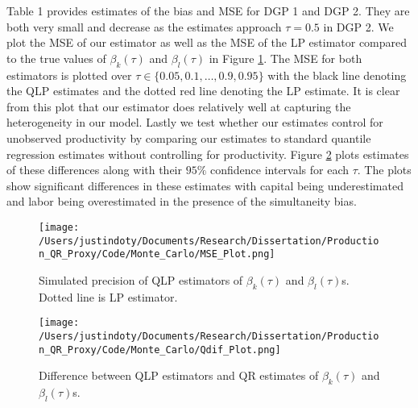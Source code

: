 \documentclass[11pt]{article}
\begin{document}
Table 1 provides estimates of the bias and MSE for DGP 1 and DGP 2. They are both very small and decrease as the estimates approach $\tau=0.5$ in DGP 2. We plot the MSE of our estimator as well as the MSE of the LP estimator compared to the true values of $\beta_{k}(\tau)$ and $\beta_{l}(\tau)$ in Figure \ref{fig:MSE}. The MSE for both estimators is plotted over $\tau\in\{0.05, 0.1, \dots, 0.9, 0.95\}$  with the black line denoting the QLP estimates and the dotted red line denoting the LP estimate. It is clear from this plot that our estimator does relatively well at capturing the heterogeneity in our model. Lastly we test whether our estimates control for unobserved productivity by comparing our estimates to standard quantile regression estimates without controlling for productivity. Figure \ref{fig:QDIF} plots estimates of these differences along with their $95\%$ confidence intervals for each $\tau$. The plots show significant differences in these estimates with capital being underestimated and labor being overestimated in the presence of the simultaneity bias.



\begin{figure}[H]
\centering
\caption{Simulated precision of  QLP estimators of $\beta_{k}(\tau)$ and $\beta_{l}(\tau)$s. Dotted line is LP estimator.}
\texttt{[image: /Users/justindoty/Documents/Research/Dissertation/Production\_QR\_Proxy/Code/Monte\_Carlo/MSE\_Plot.png]}
\label{fig:MSE}
\end{figure}

\begin{figure}[ht]
\centering
\caption{Difference between QLP estimators and QR estimates of $\beta_{k}(\tau)$ and $\beta_{l}(\tau)$s.}
\texttt{[image: /Users/justindoty/Documents/Research/Dissertation/Production\_QR\_Proxy/Code/Monte\_Carlo/Qdif\_Plot.png]}
\label{fig:QDIF}
\end{figure}

\newpage
\end{document}
